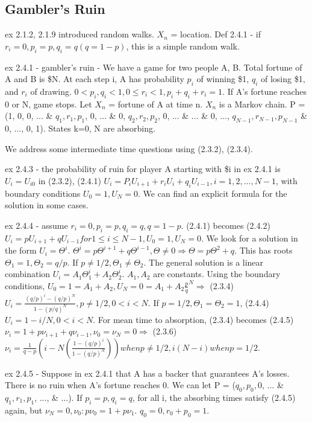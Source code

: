 \documentclass{article}
\begin{document}
\subsection{Gambler's Ruin}

ex 2.1.2, 2.1.9 introduced random walks. $X_n$ = location.
Def 2.4.1 - if $r_i = 0, p_i = p, q_i = q (q = 1-p)$, this is a simple random walk.

ex 2.4.1 - gambler's ruin - We have a game for two people A, B. Total fortune of A and B is \$N. At each step i, A has probability $p_i$ of winning \$1, $q_i$ of losing \$1, and $r_i$ of drawing. $0 < p_i, q_i < 1, 0 \le r_i < 1, p_i + q_i + r_i = 1$. If A's fortune reaches 0 or N, game stops. Let $X_n$ = fortune of A at time n. $X_n$ is a Markov chain. P = (1, 0, 0, ... \& $q_1, r_1, p_1$, 0, ... \& 0, $q_2, r_2, p_2$, 0, ... \& ... \& 0, ..., $q_{N-1}, r_{N-1}, p_{N-1}$ \& 0, ..., 0, 1). States k=0, N are absorbing.

We address some intermediate time questions using (2.3.2), (2.3.4).

ex 2.4.3 - the probability of ruin for player A starting with \$i in ex 2.4.1 is $U_i = U_{i0}$ in (2.3.2), (2.4.1) $U_i = P_i U_{i+1} + r_i U_i + q_i U_{i-1}, i=1, 2, ..., N-1$, with boundary conditions $U_0 = 1, U_N = 0$. We can find an explicit formula for the solution in some cases.

ex 2.4.4 - assume $r_i = 0, p_i = p, q_i = q, q = 1-p$. (2.4.1) becomes (2.4.2) $U_i = p U_{i+1} + q U_{i-1} for 1 \le i \le N-1, U_0=1, U_N=0$. We look for a solution in the form $U_i = \Theta^i$. $\Theta^i = p \Theta^{i+1} + q \Theta^{i-1}, \Theta \ne 0 \Rightarrow \Theta = p \Theta^2 + q$. This has roots $\Theta_1 = 1, \Theta_2 = q/p$. If $p \ne 1/2, \Theta_1 \ne \Theta_2$. The general solution is a linear combination $U_i = A_1 \Theta_1^i + A_2 \Theta_2^i$. $A_1, A_2$ are constants. Using the boundary conditions, $U_0 = 1 = A_1 + A_2, U_N = 0 = A_1 + A_2 \frac{p}{q}^N \Rightarrow $ (2.3.4) $U_i = \frac{(q/p)^i - (q/p)^N}{1 - (p/q)^N}, p \ne 1/2, 0 < i < N$. If $p = 1/2, \Theta_1 = \Theta_2 = 1$, (2.4.4) $U_i = 1 - i/N, 0 < i < N$. For mean time to absorption, (2.3.4) becomes (2.4.5) $\nu_i = 1 + p \nu_{i+1} + q \nu_{i-1}, \nu_0 = \nu_N = 0 \Rightarrow$ (2.3.6) $\nu_i = \frac{1}{q-p} (i - N ( \frac {1 - (q/p)^i}{1 - (q/p)^N})) when p \ne 1/2, i(N-i) when p = 1/2$.

ex 2.4.5 - Suppose in ex 2.4.1 that A has a backer that guarantees A's losses. There is no ruin when A's fortune reaches 0. We can let P = ($q_0, p_0, 0$, ... \& $q_1, r_1, p_1$, ..., \& ...). If $p_i = p, q_i = q$, for all i, the absorbing times satisfy (2.4.5) again, but $\nu_N = 0, \nu_0: p \nu_0 = 1 + p \nu_1$. $q_0 = 0, r_0 + p_0 = 1$.
\end{document}
